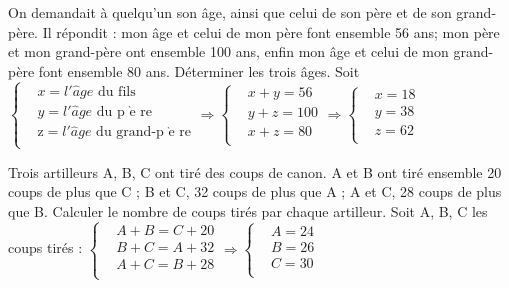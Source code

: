 \begin{solution}
On demandait à quelqu’un son âge, ainsi que celui de son père et de son grand-père. Il répondit : mon âge et celui de mon père font ensemble 56 ans; mon père et mon grand-père ont ensemble 100  ans, enfin mon âge et celui de mon grand-père font ensemble 80 ans. Déterminer les trois âges.
Soit $\left\{ \begin{array}{ll}
  & x=l'\hat{a}ge\text{ du fils} \\ 
 & y=l'\hat{a}ge\text{ du p }\!\!\grave{\mathrm{e}}\!\!\text{ re} \\ 
 & \text{z}=l'\hat{a}ge\text{ du grand-p }\!\!\grave{\mathrm{e}}\!\!\text{ re} \\ 
\end{array} \right.\Rightarrow \left\{ \begin{array}{ll}
  & x+y=56 \\ 
 & y+z=100 \\ 
 & x+z=80 \\ 
\end{array} \right.\Rightarrow \left\{ \begin{array}{ll}
  & x=18 \\ 
 & y=38 \\ 
 & z=62 \\ 
\end{array} \right.$
\end{solution}

\begin{solution}
Trois artilleurs A, B, C ont tiré des coups de canon. A et B ont tiré ensemble 20 coups de plus que C ; B et C, 32 coups de plus que A ; A et C, 28 coups de plus que B. Calculer le nombre de coups tirés par chaque artilleur.
Soit A, B, C les coups tirés : $\left\{ \begin{array}{ll}
  & A+B=C+20 \\ 
 & B+C=A+32 \\ 
 & A+C=B+28 \\ 
\end{array} \right.\Rightarrow \left\{ \begin{array}{ll}
  & A=24 \\ 
 & B=26 \\ 
 & C=30 \\ 
\end{array} \right.$
\end{solution}

